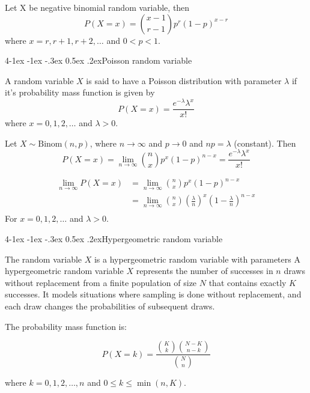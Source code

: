 \documentclass{tufte-handout}
\makeatletter
\renewcommand{\paragraph}{\@startsection{paragraph}%
    {4}{\z@}{-1ex \@plus -1ex \@minus -.3ex}%
    {0.5ex \@plus .2ex}{\normalfont\normalsize\bfseries}}
\makeatother
\begin{document}
\begin{Theorem}
    Let X be negative binomial random variable, then
    \[ P(X = x) = \binom{x-1}{r-1} p^r (1-p)^{x-r} \]
    where \( x = r, r+1, r+2, \ldots \) and \( 0 < p < 1 \).
\end{Theorem}

\paragraph{Poisson random variable}
\begin{Definition}
    A random variable \( X \) is said to have a Poisson distribution with parameter \( \lambda \)
    if it's probability mass function is given by
    \[ P(X = x) = \frac{e^{-\lambda} \lambda^x}{x!} \]
    where \( x = 0,1,2,\ldots \) and \( \lambda > 0 \).
\end{Definition}

\begin{Theorem}
    Let \( X \sim \text{Binom}(n,p)\), where \( n \rightarrow \infty \) and \( p \rightarrow 0 \)
    and \( np = \lambda \) (constant). Then
    \[ P(X = x) = \lim_{n \rightarrow \infty} \binom{n}{x} p^x (1-p)^{n-x} = \frac{e^{-\lambda} \lambda^x}{x!} \]
\end{Theorem}

\begin{align}
        \lim_{n \rightarrow \infty} P(X = x) &= \lim_{n \rightarrow \infty} \binom{n}{x} p^x (1-p)^{n-x} \\
        &= \lim_{n \rightarrow \infty} \binom{n}{x} (\frac{\lambda}{n})^x (1-\frac{\lambda}{n})^{n-x} \\
    \end{align}
For \( x = 0,1,2,\ldots \) and \( \lambda > 0 \).

\paragraph{Hypergeometric random variable}
    \begin{Definition}
        The random variable \( X \) is a hypergeometric random variable with parameters
        A hypergeometric random variable $X$ represents the number of successes in $n$ draws without replacement from a finite population of size $N$ that contains exactly $K$ successes. It models situations where sampling is done without replacement, and each draw changes the probabilities of subsequent draws.

        The probability mass function is:

        \[ P(X = k) = \frac{\binom{K}{k} \binom{N - K}{n - k}}{\binom{N}{n}} \]

        where $k = 0, 1, 2, \ldots, n$ and $0 \leq k \leq \min(n, K)$.
    \end{Definition}
\end{document}
